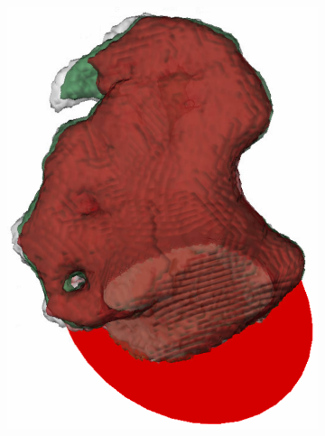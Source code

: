 \documentclass[review]{elsarticle}
\begin{document}
\begin{figure}[t]
\begin{subfigure}[b]{.16\linewidth}
    \includegraphics[width=\textwidth]{fig15_3.png}
    \caption{}
  \end{subfigure}%
  \begin{subfigure}[b]{.16\linewidth}
    \centering

\end{subfigure}
\end{figure}
\end{document}
